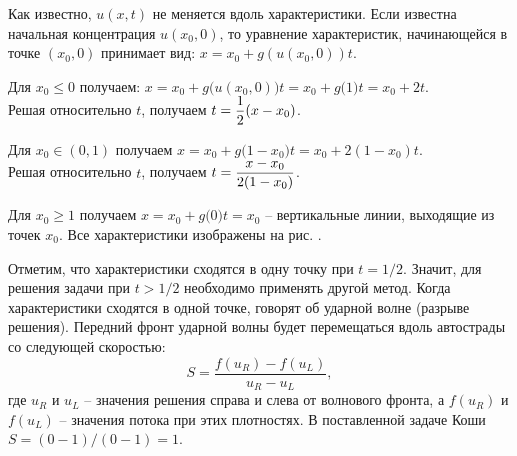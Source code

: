 Как известно, \( u(x, t) \) не меняется вдоль характеристики. Если известна
начальная концентрация \( u(x_0, 0) \), то уравнение характеристик, начинающейся
в точке \( (x_0, 0) \) принимает вид: \( x = x_0 + g(u(x_0, 0))t \).

Для \( x_0 \le 0 \) получаем:
\( x = x_0 + g\bigl(u(x_0, 0)\bigr)t = x_0 + g\bigl(1\bigr)t = x_0 + 2t \).\\
Решая относительно \( t \), получаем \( \displaystyle t = \frac{1}{2}(x - x_0) \).

Для \( x_0 \in (0, 1) \) получаем
\( x = x_0 + g\bigl(1-x_0\bigr)t = x_0 + 2(1-x_0)t \).\\
Решая относительно \( t \), получаем \( \displaystyle t = \frac{x-x_0}{2(1 - x_0)} \).

Для \( x_0 \ge 1 \) получаем \( x = x_0 + g\bigl(0\bigr)t = x_0 \) --
вертикальные линии, выходящие из точек \( x_0 \). Все характеристики изображены
на рис. \smiley.

Отметим, что характеристики сходятся в одну точку при \( t = 1/2 \). Значит, для
решения задачи при \( t > 1/2 \) необходимо применять другой метод. Когда
характеристики сходятся в одной точке, говорят об ударной волне (разрыве
решения). Передний фронт ударной волны будет перемещаться вдоль автострады со
следующей скоростью:
\[
    S = \frac{f(u_R) - f(u_L)}{u_R - u_L},
\]
где \( u_R \) и \( u_L \) -- значения решения справа и слева от волнового
фронта, а \( f(u_R) \) и \( f(u_L) \) -- значения потока при этих плотностях. В
поставленной задаче Коши \( S = (0 - 1)/(0 - 1) = 1 \).

\newpage
